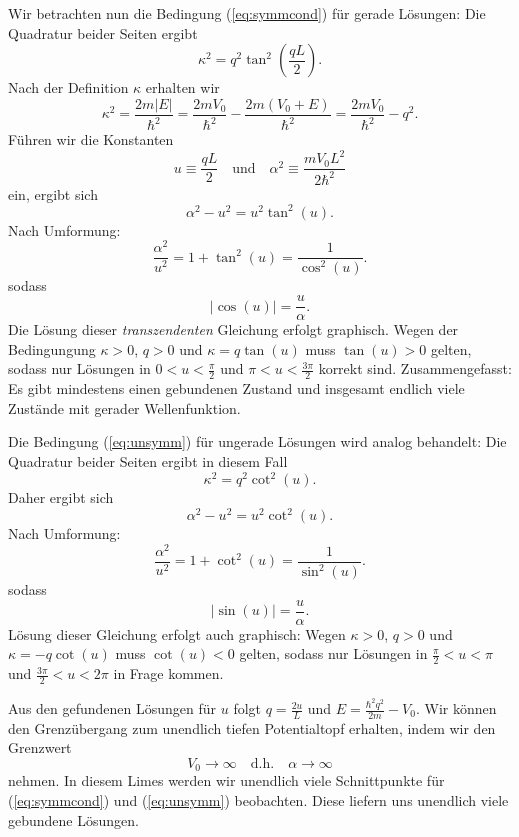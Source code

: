 Wir betrachten nun die Bedingung (\ref{eq:symmcond}) für gerade Lösungen: Die Quadratur beider Seiten ergibt
\begin{equation}
	\kappa^2 = q^2\tan^2\left(\frac{qL}{2}\right).
\end{equation}
Nach der Definition $\kappa$ erhalten wir
\begin{equation}
	\kappa^2 = \frac{2m|E|}{\hbar^2} = \frac{2mV_0}{\hbar^2} - \frac{2m(V_0+E)}{\hbar^2} = \frac{2mV_0}{\hbar^2} - q^2.
\end{equation}
Führen wir die Konstanten
\begin{equation}
	u\equiv \frac{qL}{2}\quad \text{und}\quad \alpha^2 \equiv \frac{m V_0 L^2}{2\hbar^2}
\end{equation}
ein, ergibt sich
\begin{equation}
	\alpha^2-u^2 = u^2\tan^2(u).
\end{equation}
Nach Umformung:
\begin{equation}
	\frac{\alpha^2}{u^2} = 1+\tan^2(u) = \frac{1}{\cos^2(u)}.
\end{equation}
sodass
\begin{equation}
	|\cos(u)| = \frac{u}{\alpha}.
\end{equation}
Die Lösung dieser \emph{transzendenten} Gleichung erfolgt graphisch. Wegen der Bedingungung $\kappa>0$, $q>0$ und $\kappa = q\tan(u)$ muss $\tan(u)>0$ gelten, sodass nur Lösungen in $0<u<\frac{\pi}{2}$ und $\pi < u < \frac{3\pi}{2}$ korrekt sind. Zusammengefasst: Es gibt mindestens einen gebundenen Zustand und insgesamt endlich viele Zustände mit gerader Wellenfunktion. 


Die Bedingung (\ref{eq:unsymm}) für ungerade Lösungen wird analog behandelt: Die Quadratur beider Seiten ergibt in diesem Fall
\begin{equation}
	\kappa^2 = q^2\cot^2\left(u\right).
\end{equation}
Daher ergibt sich
\begin{equation}
	\alpha^2-u^2 = u^2\cot^2(u).
\end{equation}
Nach Umformung:
\begin{equation}
	\frac{\alpha^2}{u^2} = 1+\cot^2(u) = \frac{1}{\sin^2(u)}.
\end{equation}
sodass
\begin{equation}
	|\sin(u)| = \frac{u}{\alpha}.
\end{equation}
Lösung dieser Gleichung erfolgt auch graphisch: Wegen $\kappa>0$, $q>0$ und $\kappa = -q\cot(u)$ muss $\cot(u)<0$ gelten, sodass nur Lösungen in $\frac{\pi}{2}<u< \pi$ und $\frac{3\pi}{2} < u < 2\pi$ in Frage kommen. 

Aus den gefundenen Lösungen für $u$ folgt $q = \frac{2u}{L}$ und $E = \frac{\hbar^2q^2}{2m}-V_0$. Wir können den Grenzübergang zum unendlich tiefen Potentialtopf erhalten, indem wir den Grenzwert
\begin{equation}
	V_0\rightarrow \infty\quad \text{d.h.} \quad \alpha\rightarrow\infty
\end{equation}
nehmen. In diesem Limes werden wir unendlich viele Schnittpunkte für (\ref{eq:symmcond}) und (\ref{eq:unsymm}) beobachten. Diese liefern uns unendlich viele gebundene Lösungen.

